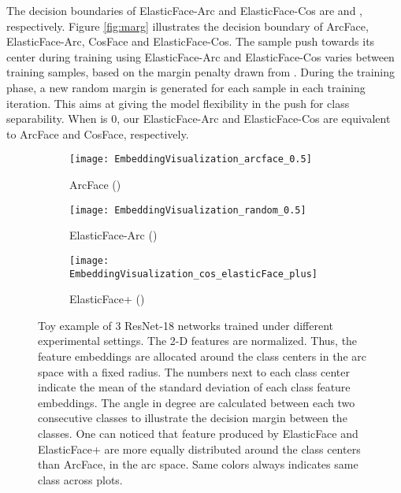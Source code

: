\documentclass[letterpaper, 10 pt, conference]{ieeeconf}  \usepackage{times}
\begin{document}
The decision boundaries of ElasticFace-Arc and ElasticFace-Cos are  and , respectively.  Figure \ref{fig:marg} illustrates the decision boundary of ArcFace, ElasticFace-Arc, CosFace and ElasticFace-Cos.
The sample push towards its center during training using ElasticFace-Arc and ElasticFace-Cos varies between training samples, based on the margin penalty drawn from . 
During the training phase, a new random margin is generated for each sample in each training iteration. This aims at giving the model flexibility in the push for class separability. When  is 0, our ElasticFace-Arc and ElasticFace-Cos are equivalent to ArcFace and CosFace, respectively.



\begin{figure*}[ht!]
     \centering
     \begin{subfigure}[t]{0.32\textwidth}
         \centering
         \texttt{[image: EmbeddingVisualization\_arcface\_0.5]}
         \caption{ArcFace ()}
         \label{fig:AF5}
     \end{subfigure}
     \hfill
     \begin{subfigure}[t]{0.32\textwidth}
         \centering
         \texttt{[image: EmbeddingVisualization\_random\_0.5]}
         \caption{
         \centering
         ElasticFace-Arc ()}
         \label{fig:EF-A5}
     \end{subfigure}
     \hfill
     \begin{subfigure}[t]{0.32\textwidth}
         \centering
         \texttt{[image: EmbeddingVisualization\_cos\_elasticFace\_plus]}
         \caption{ElasticFace+ ()}
         \label{fig:EF-A5Plus}
     \end{subfigure}
\caption{Toy example of 3 ResNet-18 networks trained under different experimental settings. The 2-D features are normalized. Thus, the feature embeddings are allocated around the class centers in the arc space with a fixed radius.
        The numbers next to each class center indicate the mean of the standard deviation of each class feature embeddings. The angle in degree are calculated between each two consecutive classes to illustrate  the decision margin between the classes. 
        One can noticed that feature produced by ElasticFace and ElasticFace+ are more equally distributed around the class centers than ArcFace, in the arc space. Same colors always indicates same class across plots.
}
        \label{fig:toy}
\end{figure*}
\end{document}
